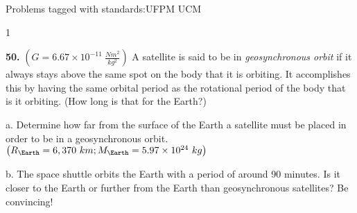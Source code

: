 

{\Large Problems tagged with standards:}UFPM UCM
\bigskip 

\AddToShipoutPicture*{\BackgroundPic}

\addtocounter {ProbNum} {1}

{\bf \Large{50.}} ${\left ( G = 6.67 \times 10^{-11}~\tfrac{Nm^2}{kg^2} \right )}$ A satellite is said to be in \emph{geosynchronous orbit} if it always stays above the same spot on the body that it is orbiting.  It accomplishes this by having the same orbital period as the rotational period of the body that is it orbiting. (How long is that for the Earth?)

\bigskip

a. Determine how far from the surface of the Earth a satellite must be placed in order to be in a geosynchronous orbit. ${\left ( R_{\Earth} = 6,370~km; M_{\Earth}=5.97 \times 10^{24}~kg \right )}$

\bigskip 
b. The space shuttle orbits the Earth with a period of around 90 minutes.  Is it closer to the Earth or further from the Earth than geosynchronous satellites?  Be convincing!

\bigskip  
\vspace{6mm}